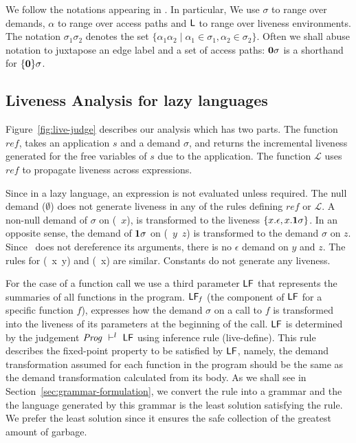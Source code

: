 \documentclass[9pt]{sigplanconf}
\begin{document}
We follow the notations appearing in \cite{asati14lgc}. In particular,
We use $\sigma$  to range over demands, $\alpha$ to  range over access
paths and  $\mathsf{L}$ to  range over  liveness environments.   The notation
$\sigma_1\sigma_2$  denotes  the  set $\lbrace  \alpha_1\alpha_2  \mid
\alpha_1 \in \sigma_1, \alpha_2  \in \sigma_2\rbrace$.  Often we shall
abuse notation to  juxtapose an edge label and a  set of access paths:
$\mathbf{0}\sigma$ is a shorthand for $\lbrace\mathbf{0}\rbrace\sigma$.

\subsection{Liveness Analysis for lazy languages}
\label{sec:liveness-analysis}


Figure~\ref{fig:live-judge}  describes  our  analysis  which  has  two
parts. The function $\mathit{ref}$,  takes  an application $s$ and
a demand $\sigma$, and returns  the incremental liveness generated for the
free  variables   of  $s$  due  to  the   application.   The  function
$\mathcal{L}$  uses   $\mathit{ref}$  to  propagate   liveness  across
expressions.

 Since  in a  lazy language,  an  expression is  not evaluated  unless
 required. The null demand ($\emptyset$) does not generate liveness in
 any  of  the  rules  defining  $\mathit{ref}$  or  $\mathcal{L}$.   A
 non-null  demand of  $\sigma$ on  (\CDR~$x$), is  transformed to  the
 liveness $\{x.\epsilon, x.\mathbf{1}\sigma\}$.  In  an opposite sense, the
 demand  of $\mathbf{1}\sigma$  on  (\CONS~$y$~$z$) is  transformed to  the
 demand  $\sigma$  on $z$.   Since  \CONS\  does not  dereference  its
 arguments, there  is no $\epsilon$ demand  on $y$ and $z$.  The rules
 for (\PRIM~x~y) and (\NULLQ~x) are similar. Constants do not generate
 any liveness.

For the  case of a  function call we  use a third  parameter $\mathsf{LF}$
that  represents  the  summaries  of all  functions  in  the  program.
$\mathsf{LF}_{\mathit  f}$  (the component  of  $\mathsf{LF}$  for a  specific
function $f$), expresses  how the demand $\sigma$ on a  call to $f$ is
transformed into  the liveness of  its parameters at the  beginning of
the   call.    $\mathsf{LF}$  is   determined   by   the  judgement 
$\mathit{Prog} \ \vdash^l\  \mathsf{LF}$ using inference rule ({\sc live-define}).
This  rule  describes the  fixed-point  property  to be  satisfied  by
$\mathsf{LF}$, namely, the demand transformation assumed for each function
in  the  program should  be  the  same  as the  demand  transformation
calculated    from    its    body.      As    we    shall    see    in
Section~\ref{sec:grammar-formulation},  we  convert  the rule  into  a
grammar and  the the language generated  by this grammar is  the least
solution satisfying  the rule. We  prefer the least solution  since it
ensures the safe collection of the greatest amount of garbage.
\end{document}

